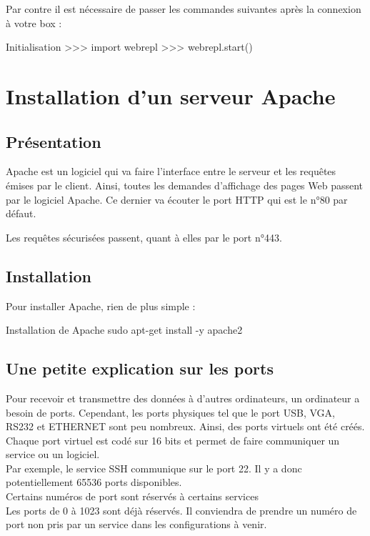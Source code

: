 {Par contre il est nécessaire de passer les commandes suivantes après la connexion à votre box :

\begin{Bash}{Initialisation}
>>> import webrepl
>>> webrepl.start()
\end{Bash}\chapter{Installation d'un serveur Apache}

\section{Présentation} \label{apache}

Apache est un logiciel qui va faire l’interface entre le serveur et les requêtes émises par le client. Ainsi, toutes les demandes d’affichage des pages Web passent par le logiciel Apache.
Ce dernier va écouter le port HTTP qui est le n°80 par défaut. \\


Les requêtes sécurisées passent, quant à elles par le port n°443. \\

\section{Installation}
Pour installer Apache, rien de plus simple :
\begin{Bash}{Installation de Apache}
sudo apt-get install -y apache2
\end{Bash}


\section{Une petite explication sur les ports}

Pour recevoir et transmettre des données à d’autres ordinateurs, un ordinateur a besoin de ports. Cependant, les ports physiques tel que le port USB, VGA, RS232 et ETHERNET sont peu nombreux. Ainsi, des ports virtuels ont été créés. \\

Chaque port virtuel est codé sur 16 bits et permet de faire communiquer un service ou un logiciel.\\
Par exemple, le service SSH communique sur le port 22. 
Il y a donc potentiellement 65536 ports disponibles. \\
Certains numéros de port sont réservés à certains services \\
Les ports de 0 à 1023 sont déjà réservés. Il conviendra de prendre un numéro de port non pris par un service dans les configurations à venir. \\

}
